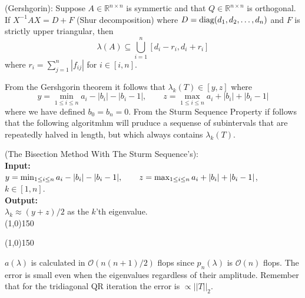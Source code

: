 %
\begin{theorem}
(Gershgorin):
Suppose $A\in\mathbb R^{n\times n}$ is symmertic and that $Q\in\mathbb R^{n\times n}$ is orthogonal.
If $X^{-1}AX = D + F$ (Shur decomposition) where $D=\text{diag}{(}d_1,d_2,\dots,d_n)$ and $F$ is strictly upper triangular, then
\begin{equation*}
	\lambda(A) \subseteq \bigcup^n_{i=1} [d_i-r_i,d_i+r_i]
\end{equation*}
where $r_i = \sum^n_{j=1}|f_{ij}|$ for $i\in[i,n]$.
\end{theorem}
%
%
From the Gershgorin theorem it follows that $\lambda_k(T)\in[y,z]$ where 
\begin{equation}
	y = \min_{1\le i\le n} a_i - |b_i| - |b_i-1|, \qquad z = \max_{1\le i\le n} a_i + |b_i| + |b_i-1|
\end{equation}
where we have defined $b_0=b_n=0$. 
From the Sturm Sequence Property if follows that the following algoritmhm will pruduce a sequense of subintervals that are repeatedly
halved in length, but which always contains $\lambda_k(T)$. 
%
%
\begin{algo}
{
%
	(The Bisection Method With The Sturm Sequence's):
%
}\\
\textbf{Input: }
{
%
	\\ $y = \min_{1\le i\le n} a_i - |b_i| - |b_i-1|, 
	\\ \qquad z = \max_{1\le i\le n} a_i + |b_i| + |b_i-1|$, 
	\\$k\in [1,n]$.
%
}\\
\textbf{Output: }
{
%
	\\$\lambda_k \approx (y+z)/2$ as the $k$'th eigenvalue.
%
}\\
\line(1,0){150}
\textbf{}
\begin{algorithmic}
%
	\Else{}
	\EndIf
\EndWhile{}
%
\end{algorithmic}
\line(1,0){150}
\end{algo}
$a(\lambda)$ is calculated in $\mathcal O(n(n+1)/2)$ flops since $p_n(\lambda)$ is $\mathcal O(n)$ 
flops. The error is small even when the eigenvalues regardless of their amplitude. Remember that 
for the tridiagonal QR iteration the error is $\propto ||T||_2$.


